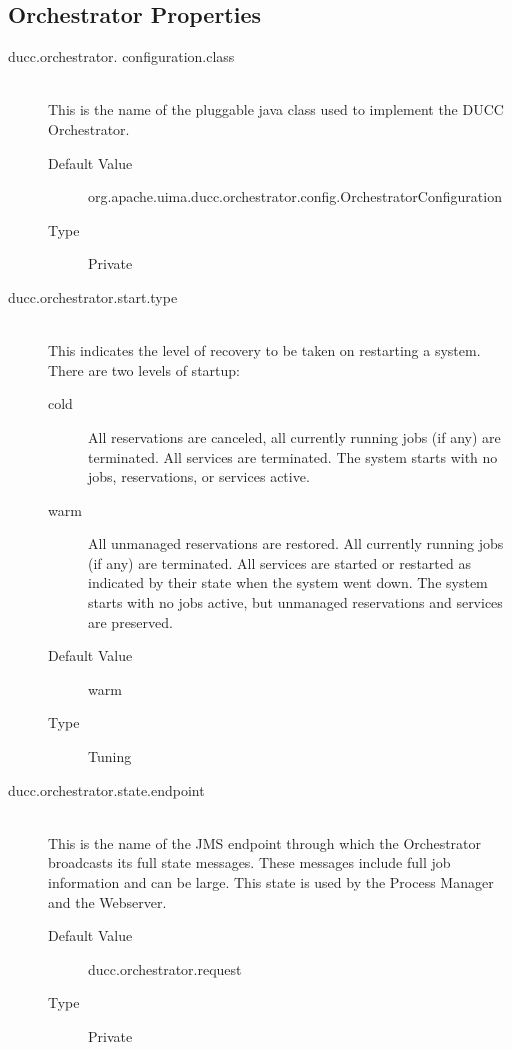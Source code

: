 \subsection{Orchestrator Properties}
    \begin{description}
      \item[ducc.orchestrator. configuration.class] \hfill \\
        This is the name of the pluggable java class used to implement the DUCC Orchestrator. 
        \begin{description}
          \item[Default Value] org.apache.uima.ducc.orchestrator.config.OrchestratorConfiguration 
          \item[Type] Private
        \end{description} 
        
      \item[ducc.orchestrator.start.type] \hfill \\
        This indicates the level of recovery to be taken on restarting a
        system. There are two levels of startup:
        \begin{description}
            \item[cold] All reservations are canceled, all currently running
            jobs (if any) are terminated. All services are terminated. The
            system starts with no jobs, reservations, or services active.

            \item[warm] All unmanaged reservations are restored. All currently
            running jobs (if any) are terminated. All services are started or
            restarted as indicated by their state when the system went down.
            The system starts with no jobs active, but unmanaged reservations
            and services are preserved.

            \item[Default Value] warm 
            \item[Type] Tuning 
        \end{description}
        

      \item[ducc.orchestrator.state.endpoint] \hfill \\
        This is the name of the JMS endpoint through which the Orchestrator broadcasts its full 
        state messages. These messages include full job information and can be large. This state is 
        used by the Process Manager and the Webserver. 
        \begin{description}
          \item[Default Value] ducc.orchestrator.request
          \item[Type] Private 
        \end{description}


\end{description}
